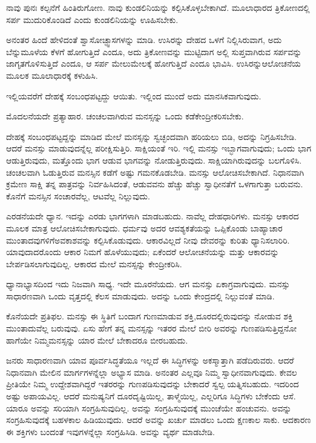 \vskip -0.2cm

ನಾವು ಪುನಃ ಕಲ್ಪನೆಗೆ ಹಿಂತಿರುಗೋಣ. ನಾವು ಕುಂಡಲಿನಿಯನ್ನು ಕಲ್ಪಿಸಿಕೊಳ್ಳಬೇಕಾಗಿದೆ. ಮೂಲಾಧಾರದ ತ್ರಿಕೋಣದಲ್ಲಿ ಸರ್ಪ ಮುದುರಿಕೊಂಡಿದೆ ಎಂದು ಕುಂಡಲಿನಿಯನ್ನು ಊಹಿಸಬೇಕು.

ಅನಂತರ ಹಿಂದೆ ಹೇಳಿದಂತೆ ಶ್ವಾಸೋಚ್ಫ್ವಾಸಗಳನ್ನು ಮಾಡಿ. ಉಸಿರನ್ನು ದೇಹದ ಒಳಗೆ ನಿಲ್ಲಿಸಿರುವಾಗ, ಅದು ಬೆನ್ನುಮೂಳೆಯ ಕೆಳಗೆ ಹೋಗುತ್ತಿದೆ ಎಂದೂ, ಅದು ತ್ರಿಕೋಣವನ್ನು ಮುಟ್ಟಿದಾಗ ಅಲ್ಲಿ ಸುಪ್ತವಾಗಿರುವ ಸರ್ಪವನ್ನು ಜಾಗೃತಗೊಳಿಸುತ್ತಿದೆ ಎಂದೂ, ಆ ಸರ್ಪ ಮೇಲುಮೇಲಕ್ಕೆ ಹೋಗುತ್ತಿದೆ ಎಂದೂ ಭಾವಿಸಿ. ಉಸಿರನ್ನು\break ಆಲೋಚನೆಯ ಮೂಲಕ ಮೂಲಾಧಾರಕ್ಕೆ ಕಳುಹಿಸಿ.

ಇಲ್ಲಿಯವರೆಗೆ ದೇಹಕ್ಕೆ ಸಂಬಂಧಪಟ್ಟದ್ದು ಆಯಿತು. ಇಲ್ಲಿಂದ ಮುಂದೆ ಅದು ಮಾನಸಿಕವಾಗುವುದು.

ಮೊದಲನೆಯದೇ ಪ್ರತ್ಯಾಹಾರ. ಚಂಚಲವಾಗಿರುವ ಮನಸ್ಸನ್ನು ಒಂದು ಕಡೆ\break ಕೇಂದ್ರೀಕರಿಸಬೇಕು.

ದೇಹಕ್ಕೆ ಸಂಬಂಧಪಟ್ಟದ್ದನ್ನು ಮಾಡಿದ ಮೇಲೆ ಮನಸ್ಸನ್ನು ಸ್ವಚ್ಛಂದವಾಗಿ ಹರಿಯಲು ಬಿಡಿ, ಅದನ್ನು ನಿಗ್ರಹಿಸಬೇಡಿ. ಆದರೆ ಮನಸ್ಸು ಮಾಡುವುದನ್ನೆಲ್ಲ ಪರೀಕ್ಷಿಸುತ್ತಿರಿ. ಸಾಕ್ಷಿಯಂತೆ ಇರಿ. ಇಲ್ಲಿ ಮನಸ್ಸು ಇಬ್ಭಾಗವಾಗುವುದು; ಒಂದು ಭಾಗ ಆಡುತ್ತಿರುವುದು, ಮತ್ತೊಂದು ಭಾಗ ಆಡುವ ಭಾಗವನ್ನು ನೋಡುತ್ತಿರುವುದು. ಸಾಕ್ಷಿಯಾಗಿರುವುದನ್ನು ಬಲಗೊಳಿಸಿ. ಚಂಚಲವಾಗಿ ಓಡುತ್ತಿರುವ ಮನಸ್ಸಿನ ಕಡೆಗೆ ಅಷ್ಟು ಗಮನಕೊಡಬೇಡಿ. ಮನಸ್ಸು ಆಲೋಚಿಸಬೇಕಾಗಿದೆ. ನಿಧಾನವಾಗಿ ಕ್ರಮೇಣ ಸಾಕ್ಷಿ ತನ್ನ ಪಾತ್ರವನ್ನು ನಿರ್ವಹಿಸಿದಂತೆ, ಆಡುವವನು ಹೆಚ್ಚು ಹೆಚ್ಚು ಸ್ವಾಧೀನತೆಗೆ ಒಳಗಾಗುತ್ತಾ ಬರುವನು. ಕೊನೆಗೆ ಮನಸ್ಸಿನ ಸಂಚಾರವೆಲ್ಲ, ಆಟವೆಲ್ಲ ನಿಲ್ಲುವುದು.

ಎರಡನೆಯದೇ ಧ್ಯಾನ. ಇದನ್ನು ಎರಡು ಭಾಗಗಳಾಗಿ ಮಾಡಬಹುದು. ನಾವೆಲ್ಲ ದೇಹಧಾರಿಗಳು. ಮನಸ್ಸು ಆಕಾರದ ಮೂಲಕ ಮಾತ್ರ ಆಲೋಚಿಸಬೇಕಾಗುವುದು. ಧರ್ಮವು ಅದರ ಆವಶ್ಯಕತೆಯನ್ನು ಒಪ್ಪಿಕೊಂಡು ಬಾಹ್ಯಾಚಾರ ಮುಂತಾದವುಗಳಿಗೆ\break ಅವಕಾಶವನ್ನು ಕಲ್ಪಿಸಿಕೊಡುವುದು. ಆಕಾರವಿಲ್ಲದೆ ನೀವು ದೇವರನ್ನು ಕುರಿತು ಧ್ಯಾನಿಸಲಾರಿರಿ. ಯಾವುದಾದರೊಂದು ಆಕಾರ ನಿಮಗೆ ಹೊಳೆಯುವುದು; ಏಕೆಂದರೆ ಆಲೋಚನೆ\-ಯನ್ನು ಮತ್ತು ಆಕಾರವನ್ನು ಬೇರ್ಪಡಿಸಲಾಗುವುದಿಲ್ಲ. ಆಕಾರದ ಮೇಲೆ ಮನಸ್ಸನ್ನು ಕೇಂದ್ರೀಕರಿಸಿ.

ಧ್ಯಾನಾಭ್ಯಾಸದಿಂದ ಇದು ನಿಜವಾಗಿ ಸಾಧ್ಯ. ಇದೇ ಮೂರನೆಯದು. ಆಗ ಮನಸ್ಸು ಏಕಾಗ್ರವಾಗುವುದು. ಮನಸ್ಸು ಸಾಧಾರಣವಾಗಿ ಒಂದು ವೃತ್ತದಲ್ಲಿ ಕೆಲಸ ಮಾಡುವುದು. ಅದನ್ನು ಒಂದು ಕೇಂದ್ರದಲ್ಲಿ ನಿಲ್ಲುವಂತೆ ಮಾಡಿ.

ಕೊನೆಯದೇ ಪ್ರತಿಫಲ. ಮನಸ್ಸು ಈ ಸ್ಥಿತಿಗೆ ಬಂದಾಗ ಗುಣಮಾಡುವ ಶಕ್ತಿ,\break ದೂರದಲ್ಲಿರುವುದನ್ನು ನೋಡುವ ಶಕ್ತಿ ಮುಂತಾದುವೆಲ್ಲ ಬರುವುವು. ಏಸು ಹೇಗೆ ತನ್ನ ಮನಸ್ಸನ್ನು ಇತರರ ಮೇಲೆ ಬೀರಿ ಅವರನ್ನು ಗುಣಪಡಿಸುತ್ತಿದ್ದನೋ ಹಾಗೆಯೇ ನಿಮ್ಮ\break ಮನಸ್ಸನ್ನು ಯಾರ ಮೇಲೆ ಬೇಕಾದರೂ ಬೀರಬಹುದು.

ಜನರು ಸಾಧಾರಣವಾಗಿ ಯಾವ ಪೂರ್ವಸಿದ್ಧತೆಯೂ ಇಲ್ಲದೆ ಈ ಸಿದ್ಧಿಗಳನ್ನು ಅಕಸ್ಮಾತ್ತಾಗಿ ಪಡೆದಿರುವರು. ಆದರೆ ನಿಧಾನವಾಗಿ ಮೇಲಿನ ಮಾರ್ಗಗಳನ್ನೆಲ್ಲಾ ಅಭ್ಯಾಸ ಮಾಡಿ. ಅನಂತರ ಎಲ್ಲವೂ ನಿಮ್ಮ ಸ್ವಾಧೀನವಾಗುವುದು. ಕೇವಲ ಪ್ರೀತಿಯೇ ನಿಮ್ಮ ಉದ್ದೇಶವಾಗಿದ್ದರೆ ಇತರರನ್ನು ಗುಣಪಡಿಸುವುದನ್ನು ಬೇಕಾದರೆ ಸ್ವಲ್ಪ ಯತ್ನಿಸಬಹುದು. ಇದರಿಂದ ಅಷ್ಟು ಅಪಾಯವಿಲ್ಲ. ಆದರೆ ಮನುಷ್ಯನಿಗೆ ದೂರದೃಷ್ಟಿಯಿಲ್ಲ, ತಾಳ್ಮೆಯಿಲ್ಲ, ಎಲ್ಲರಿಗೂ ಸಿದ್ಧಿಗಳು ಬೇಕೆಂದು ಆಸೆ. ಯಾರೂ ಅವನ್ನು ಸರಿಯಾಗಿ ಸಂಗ್ರಹಿಸುವುದಿಲ್ಲ. ಅವನ್ನು ಸಂಗ್ರಹಿಸುವುದಕ್ಕೆ ಮುಂಚೆಯೇ ಹಂಚುವನು. ಅವನ್ನು ಸಂಗ್ರಹಿಸುವುದಕ್ಕೆ ಬಹಳಕಾಲ ಹಿಡಿಯುವುದು. ಆದರೆ ಅವನ್ನು ಖರ್ಚು ಮಾಡಲು ಒಂದು ಕ್ಷಣಕಾಲ ಸಾಕು. ಆದಕಾರಣ ಈ ಶಕ್ತಿಗಳು ಬಂದಂತೆ ಇವುಗಳನ್ನೆಲ್ಲಾ ಸಂಗ್ರಹಿಸಿಡಿ. ಅವನ್ನು ವ್ಯರ್ಥ ಮಾಡಬೇಡಿ.

